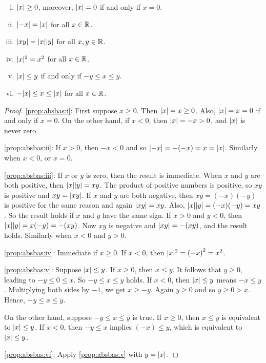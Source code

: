 \begin{prop} \label{prop:absbas}
\leavevmode
\begin{enumerate}[(i)]
\item \label{prop:absbas:i} $\lvert {x} \rvert \geq 0$, moreover, $\lvert {x} \rvert=0$ if and only if $x = 0$.
\item \label{prop:absbas:ii} $\lvert {-x} \rvert = \lvert {x} \rvert$ for all $x \in {\mathbb{R}}$.
\item \label{prop:absbas:iii} $\lvert {xy} \rvert = \lvert {x} \rvert\lvert {y} \rvert$ for all $x,y \in {\mathbb{R}}$.
\item \label{prop:absbas:iv} $\lvert {x} \rvert^2 = x^2$ for all $x \in {\mathbb{R}}$.
\item \label{prop:absbas:v} $\lvert {x} \rvert \leq y$ if and only if $-y \leq x \leq y$.
\item \label{prop:absbas:vi} $-\lvert {x} \rvert \leq x \leq \lvert {x} \rvert$ for all $x \in {\mathbb{R}}$.
\end{enumerate}
\end{prop}

\begin{proof}
\ref{prop:absbas:i}:
First suppose $x \geq 0$.
Then $\lvert {x} \rvert = x \geq 0$.  Also, $\lvert {x} \rvert = x = 0$ if and only
if $x=0$.
On the other hand, if $x < 0$, then $\lvert {x} \rvert = -x > 0$, and $\lvert {x} \rvert$ is never zero.

\medskip

\ref{prop:absbas:ii}: If $x > 0$, then $-x < 0$ and so $\lvert {-x} \rvert = -(-x) = x =
\lvert {x} \rvert$.  Similarly when $x < 0$, or $x = 0$.

\medskip

\ref{prop:absbas:iii}:
If $x$ or $y$ is zero, then the result is immediate.  When $x$ and
$y$ are both positive, then $\lvert {x} \rvert\lvert {y} \rvert = xy$.  The product of positive
numbers is positive, so $xy$ is 
positive and $xy = \lvert {xy} \rvert$.
If $x$ and $y$ are both negative,
then $xy=(-x)(-y)$ is positive for the same reason and again $\lvert {xy} \rvert=xy$.  Also,
$\lvert {x} \rvert\lvert {y} \rvert = (-x)(-y) = xy$.
So the result holds if $x$ and $y$ have the same sign.
If $x > 0$ and $y < 0$, then $\lvert {x} \rvert\lvert {y} \rvert = x(-y) = -(xy)$.  Now
$xy$ is negative and $\lvert {xy} \rvert = -(xy)$, and the result holds.  Similarly when
$x < 0$ and $y > 0$.

\medskip

\ref{prop:absbas:iv}:
Immediate if $x \geq 0$.  If $x < 0$, then $\lvert {x} \rvert^2 = {(-x)}^2 =
x^2$.

\medskip

\ref{prop:absbas:v}:
Suppose $\lvert {x} \rvert \leq y$.
If $x \geq 0$, then $x \leq y$.
It follows that $y \geq 0$, leading to $-y \leq 0 \leq x$.
So $-y \leq x \leq y$ holds.
If $x < 0$, then $\lvert {x} \rvert \leq y$ means $-x \leq y$.
Multiplying both sides by $-1$, we get $x \geq -y$.
Again $y \geq 0$ and so $y \geq 0 > x$.
Hence, $-y \leq x \leq y$.

On the other hand, suppose $-y \leq x \leq y$ is true.
If $x \geq 0$, then $x \leq y$ is equivalent to $\lvert {x} \rvert \leq y$.
If $x < 0$, then $-y \leq x$ implies $(-x) \leq y$,
which is equivalent to $\lvert {x} \rvert \leq y$.

\medskip

\ref{prop:absbas:vi}:
Apply \ref{prop:absbas:v} with $y = \lvert {x} \rvert$.
\end{proof}

